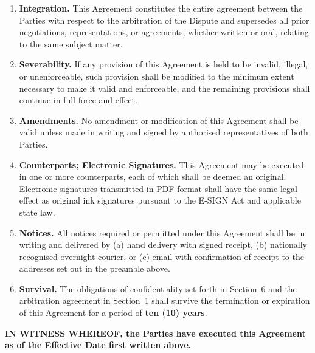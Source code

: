 \documentclass[11pt,a4paper]{article}
\begin{document}
\begin{enumerate}
  \item \textbf{Integration.} This Agreement constitutes the entire agreement
    between the Parties with respect to the arbitration of the Dispute and
    supersedes all prior negotiations, representations, or agreements, whether
    written or oral, relating to the same subject matter.

  \item \textbf{Severability.} If any provision of this Agreement is held to
    be invalid, illegal, or unenforceable, such provision shall be modified to
    the minimum extent necessary to make it valid and enforceable, and the
    remaining provisions shall continue in full force and effect.

  \item \textbf{Amendments.} No amendment or modification of this Agreement
    shall be valid unless made in writing and signed by authorised
    representatives of both Parties.

  \item \textbf{Counterparts; Electronic Signatures.} This Agreement may be
    executed in one or more counterparts, each of which shall be deemed an
    original. Electronic signatures transmitted in PDF format shall have the
    same legal effect as original ink signatures pursuant to the E-SIGN Act
    and applicable state law.

  \item \textbf{Notices.} All notices required or permitted under this
    Agreement shall be in writing and delivered by (a) hand delivery with
    signed receipt, (b) nationally recognised overnight courier, or (c)
    email with confirmation of receipt to the addresses set out in the
    preamble above.

  \item \textbf{Survival.} The obligations of confidentiality set forth in
    Section~6 and the arbitration agreement in Section~1 shall survive the
    termination or expiration of this Agreement for a period of
    \textbf{ten (10) years}.
\end{enumerate}

\vspace{8mm}

\begin{tcolorbox}[
  enhanced,
  colback=NavyDeep,
  colframe=NavyDeep,
  arc=3pt,
  left=10pt, right=10pt, top=6pt, bottom=6pt
]
  \sffamily\bfseries\small\color{White}
  IN WITNESS WHEREOF, the Parties have executed this Agreement as of the
  Effective Date first written above.
\end{tcolorbox}
\end{document}
